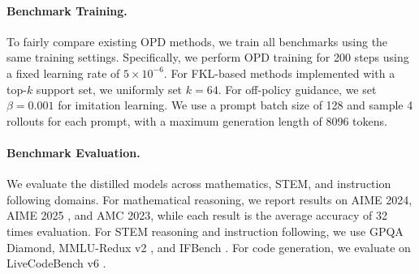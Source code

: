 \documentclass{article} %
\renewcommand{\cite}[1]{\citep{#1}}
\begin{document}
\begin{table}[!t]
\centering
\small
\setlength{\tabcolsep}{6pt}
\renewcommand{\arraystretch}{1.1}
\caption{Performance comparison between TrOPD and concurrent AOPD. TrOPD + AOPD indicates TrOPD adding the AOPD objective for the AOPD positive samples.}
\label{tab:aopd_comparison}
\end{table}




\paragraph{Benchmark Training.}
To fairly compare existing OPD methods, we train all benchmarks using the same training settings. Specifically, we perform OPD training for 200 steps using a fixed learning rate of $5 \times 10^{-6}$. For FKL-based methods implemented with a top-$k$ support set, we uniformly set $k=64$. For off-policy guidance, we set $\beta=0.001$ for imitation learning. We use a prompt batch size of 128 and sample 4 rollouts for each prompt, with a maximum generation length of 8096 tokens.


\paragraph{Benchmark Evaluation.}
We evaluate the distilled models across mathematics, STEM, and instruction following domains. For mathematical reasoning, we report results on AIME 2024, AIME 2025 \cite{shi2025aime}, and AMC 2023, while each result is the average accuracy of 32 times evaluation. For STEM reasoning and instruction following, we use GPQA Diamond, MMLU-Redux v2 \cite{gema2025we}, and IFBench \cite{pyatkin2025generalizing}. For code generation, we evaluate on LiveCodeBench v6 \cite{jain2025livecodebench}.
\end{document}
